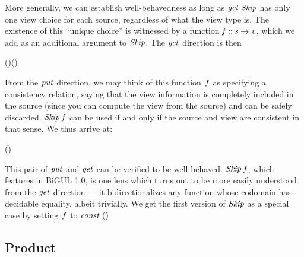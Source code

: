More generally, we can establish well-behavedness as long as \ensuremath{\Varid{get}\;\Conid{Skip}} has only one view choice for each source, regardless of what the view type is.
The existence of this ``unique choice'' is witnessed by a function \ensuremath{\Varid{f}\mathbin{::}\Varid{s}\to \Varid{v}}, which we add as an additional argument to \ensuremath{\Conid{Skip}}.
The \ensuremath{\Varid{get}} direction is then
\begin{hscode}\SaveRestoreHook
{}%
%
\>[B]{}\;(\;)\;\mathrel{=}\;(\;){}\<[E]%
\ColumnHook
\end{hscode}\resethooks
From the \ensuremath{\Varid{put}} direction, we may think of this function~\ensuremath{\Varid{f}} as specifying a consistency relation, saying that the view information is completely included in the source (since you can compute the view from the source) and can be safely discarded.
\ensuremath{\Conid{Skip}\;\Varid{f}} can be used if and only if the source and view are consistent in that sense.
We thus arrive at:
\begin{hscode}\SaveRestoreHook
{}%
%
\>[B]{}\;(\;)\;\;\mathrel{=}\;\equiv {}\;\;\;\;\;\;\<[E]%
\ColumnHook
\end{hscode}\resethooks
This pair of \ensuremath{\Varid{put}} and \ensuremath{\Varid{get}} can be verified to be well-behaved.
\ensuremath{\Conid{Skip}\;\Varid{f}}, which features in BiGUL 1.0, is one lens which turns out to be more easily understood from the \ensuremath{\Varid{get}} direction --- it bidirectionalizes any function whose codomain has decidable equality, albeit trivially.
We get the first version of \ensuremath{\Conid{Skip}} as a special case by setting~\ensuremath{\Varid{f}} to \ensuremath{\Varid{const}\;()}.

\subsection{Product}

